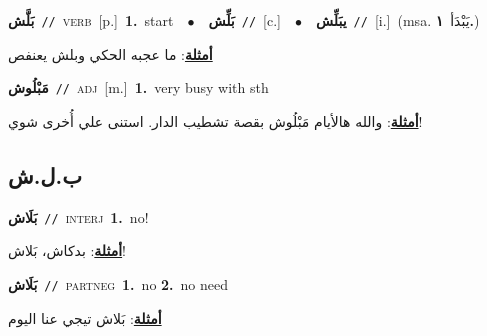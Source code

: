 \documentclass[10pt,a4paper,twoside]{article} %
\begin{document}
\begin{multicols}{2}
{\setlength\topsep{0pt}\textbf{\foreignlanguage{arabic}{بَلَّش}}\ {\color{gray}\texttt{//}\color{black}}\ \textsc{verb}\ [p.]\ \textbf{1.}~start\ \ $\bullet$\ \ \setlength\topsep{0pt}\textbf{\foreignlanguage{arabic}{بَلِّش}}\ {\color{gray}\texttt{//}\color{black}}\ [c.]\ \ $\bullet$\ \ \setlength\topsep{0pt}\textbf{\foreignlanguage{arabic}{يبَلِّش}}\ {\color{gray}\texttt{//}\color{black}}\ [i.]\ \color{gray}(msa. \foreignlanguage{arabic}{يَبْدَأ}~\foreignlanguage{arabic}{\textbf{١.}})\color{black}\  \begin{flushright}\color{gray}\foreignlanguage{arabic}{\textbf{\underline{\foreignlanguage{arabic}{أمثلة}}}: ما عجبه الحكي وبلش يعنفص}\end{flushright}\color{black}} \vspace{2mm}

{\setlength\topsep{0pt}\textbf{\foreignlanguage{arabic}{مَبْلُوش}}\ {\color{gray}\texttt{//}\color{black}}\ \textsc{adj}\ [m.]\ \textbf{1.}~very busy with sth\  \begin{flushright}\color{gray}\foreignlanguage{arabic}{\textbf{\underline{\foreignlanguage{arabic}{أمثلة}}}: والله هالأيام مَبْلُوش بقصة تشطيب الدار. استنى علي أُخرى شوي!}\end{flushright}\color{black}} \vspace{2mm}

\vspace{-3mm}
\subsection*{\color{blue}\foreignlanguage{arabic}{ب.ل.ش}\color{blue}{ (ntws)}} 

{\setlength\topsep{0pt}\textbf{\foreignlanguage{arabic}{بَلَاش}}\ {\color{gray}\texttt{//}\color{black}}\ \textsc{interj}\ \textbf{1.}~no!\  \begin{flushright}\color{gray}\foreignlanguage{arabic}{\textbf{\underline{\foreignlanguage{arabic}{أمثلة}}}: بدكاش، بَلاش!}\end{flushright}\color{black}} \vspace{2mm}

{\setlength\topsep{0pt}\textbf{\foreignlanguage{arabic}{بَلَاش}}\ {\color{gray}\texttt{//}\color{black}}\ \textsc{part\textunderscore neg}\ \textbf{1.}~no  \textbf{2.}~no need\  \begin{flushright}\color{gray}\foreignlanguage{arabic}{\textbf{\underline{\foreignlanguage{arabic}{أمثلة}}}: بَلاش تيجي عنا اليوم}\end{flushright}\color{black}} \vspace{2mm}


\end{multicols}
\end{document}
